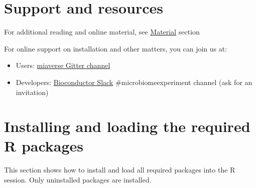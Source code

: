 \documentclass[
]{book}
\providecommand{\tightlist}{%
  \setlength{\itemsep}{0pt}\setlength{\parskip}{0pt}}
\begin{document}
\hypertarget{support-and-resources}{%
\section{Support and resources}\label{support-and-resources}}

For additional reading and online material, see \href{material.html}{Material} section

For online support on installation and other matters, you can join us at:

\begin{itemize}
\tightlist
\item
  Users: \href{https://gitter.im/microbiome/miaverse?utm_source=badge\&utm_medium=badge\&utm_campaign=pr-badge\&utm_content=badge}{miaverse Gitter channel}
\item
  Developers: \href{https://bioc-community.herokuapp.com}{Bioconductor Slack} \#microbiomeexperiment channel (ask for an invitation)
\end{itemize}

\hypertarget{installing-and-loading-the-required-r-packages}{%
\section{Installing and loading the required R packages}\label{installing-and-loading-the-required-r-packages}}

This section shows how to install and load all required packages into
the R session. Only uninstalled packages are installed.
\end{document}
